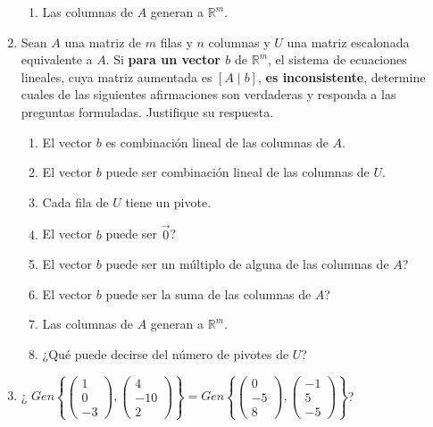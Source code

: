 \documentclass{article}
\begin{document}
\begin{enumerate}
\begin{enumerate}[label=\listAlph]
            \item Las columnas de \(A\) generan a \(\mathbb{R}^m\).
        \end{enumerate}
    \item Sean \(A\) una matriz de \(m\) filas y \(n\) columnas y \(U\) una matriz escalonada equivalente a \(A\). 
        Si \textbf{para un vector \(b\)} de \(\mathbb{R}^m\),
        el sistema de ecuaciones lineales, cuya matriz aumentada es \(\left[A \mid b\right]\),
        \textbf{es inconsistente}, 
        determine cuales de las siguientes afirmaciones son verdaderas y responda a las preguntas formuladas. 
        Justifique su respuesta.
        \begin{enumerate}[label=\listAlph]
            \item El vector \(b\) es combinación lineal de las columnas de \(A\).
            \item El vector \(b\) puede ser combinación lineal de las columnas de \(U\).
            \item Cada fila de \(U\) tiene un pivote.
            \item El vector \(b\) puede ser \(\vec{0}\)?
            \item El vector \(b\) puede ser un múltiplo de alguna de las columnas de \(A\)?
            \item El vector \(b\) puede ser la suma de las columnas de \(A\)?
            \item Las columnas de \(A\) generan a \(\mathbb{R}^m\).
            \item ¿Qué puede decirse del número de pivotes de \(U\)?
        \end{enumerate}
    \item ¿%
        \(
            Gen
            \left\{
                \begin{pmatrix}
                    1 \\ 0 \\ -3
                \end{pmatrix},
                \begin{pmatrix}
                    4 \\ -10 \\ 2
                \end{pmatrix}
            \right\}
            =
            Gen
            \left\{
                \begin{pmatrix}
                    0 \\ -5 \\ 8
                \end{pmatrix},
                \begin{pmatrix}
                    -1 \\ 5 \\ -5
                \end{pmatrix}
            \right\}
        \)?
\end{enumerate}
\end{document}
